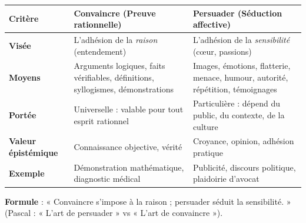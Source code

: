 \documentclass[11pt]{article}
\begin{document}
\begin{aretenir}
\begin{center}
\begin{tabularx}{\linewidth}{|l|X|X|}\hline
\textbf{Critère} & \textbf{Convaincre (Preuve rationnelle)} & \textbf{Persuader (Séduction affective)} \\ \hline
\textbf{Visée} & L'adhésion de la \emph{raison} (entendement) & L'adhésion de la \emph{sensibilité} (cœur, passions) \\ \hline
\textbf{Moyens} & Arguments logiques, faits vérifiables, définitions, syllogismes, démonstrations & Images, émotions, flatterie, menace, humour, autorité, répétition, témoignages \\ \hline
\textbf{Portée} & Universelle : valable pour tout esprit rationnel & Particulière : dépend du public, du contexte, de la culture \\ \hline
\textbf{Valeur épistémique} & Connaissance objective, vérité & Croyance, opinion, adhésion pratique \\ \hline
\textbf{Exemple} & Démonstration mathématique, diagnostic médical & Publicité, discours politique, plaidoirie d'avocat \\ \hline
\end{tabularx}
\end{center}
\textbf{Formule} : « Convaincre s'impose à la raison ; persuader séduit la sensibilité. » (Pascal : « L'art de persuader » vs « L'art de convaincre »).
\end{aretenir}
\end{document}
